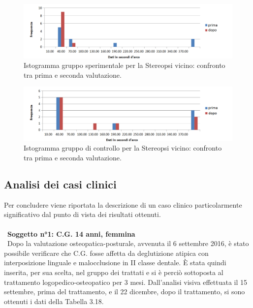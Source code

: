  \begin{figure}[h!]
	\centering
	\includegraphics[scale=0.38]{source/grafici/STEREOPSI_VICINO_TRATTATI.png}
	\caption[Istogramma gruppo sperimentale per la Stereopsi vicino]{Istogramma gruppo sperimentale per la Stereopsi vicino: confronto tra prima e seconda valutazione.}
	\label{fig:issuexample}
\end{figure}
 \begin{figure}[h!]
	\centering
	\includegraphics[scale=0.38]{source/grafici/STEREOPSI_VICINO_NON_TRATTATI.png}
	\caption[Istogramma gruppo di controllo per la Stereopsi vicino]{Istogramma gruppo di controllo per la Stereopsi vicino: confronto tra prima e seconda valutazione.}
	\label{fig:issuexample}
\end{figure}

\subsection{Analisi dei casi clinici}

Per concludere viene riportata la descrizione di un caso clinico particolarmente significativo dal punto di vista dei risultati ottenuti.
\\\ \\\
\textbf{Soggetto n°1: C.G. 14 anni, femmina}
\\\
Dopo la valutazione osteopatica-posturale, avvenuta il 6 settembre 2016, è stato possibile verificare che C.G. fosse affetta da deglutizione atipica con interposizione linguale e malocclusione in II classe dentale. È stata quindi inserita, per sua scelta, nel gruppo dei trattati e si è perciò sottoposta al trattamento logopedico-osteopatico per 3 mesi. Dall’analisi visiva effettuata il 15 settembre, prima del trattamento, e il 22 dicembre, dopo il trattamento, si sono ottenuti i dati della Tabella 3.18.

